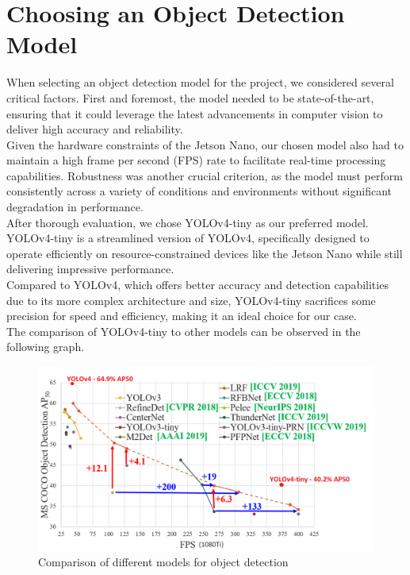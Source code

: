 \section{Choosing an Object Detection Model}
\label{sec:choosing}
When selecting an object detection model for the project, we considered several critical factors. First and foremost, the model needed to be state-of-the-art, ensuring that it could leverage the latest advancements in computer vision to deliver high accuracy and reliability. \\
Given the hardware constraints of the Jetson Nano, our chosen model also had to maintain a high frame per second (FPS) rate to facilitate real-time processing capabilities. Robustness was another crucial criterion, as the model must perform consistently across a variety of conditions and environments without significant degradation in performance. \\
After thorough evaluation, we chose YOLOv4-tiny as our preferred model. YOLOv4-tiny is a streamlined version of YOLOv4, specifically designed to operate efficiently on resource-constrained devices like the Jetson Nano while still delivering impressive performance. \\
Compared to YOLOv4, which offers better accuracy and detection capabilities due to its more complex architecture and size, YOLOv4-tiny sacrifices some precision for speed and efficiency, making it an ideal choice for our case. \\
The comparison of YOLOv4-tiny to other models can be observed in the following graph.

\begin{figure}[ht]
    \includegraphics[width=\textwidth]{figures/yolov4-comparison.png}
    \caption{Comparison of different models for object detection}
    \label{fig:model_comparison}
\end{figure}

